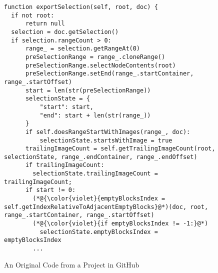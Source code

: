 \begin{figure}[t]
	\centering
	\begin{lstlisting}[]
function exportSelection(self, root, doc) {
  if not root: 
      return null
  selection = doc.getSelection()
  if selection.rangeCount > 0:
      range_ = selection.getRangeAt(0)
      preSelectionRange = range_.cloneRange()
      preSelectionRange.selectNodeContents(root)
      preSelectionRange.setEnd(range_.startContainer, range_.startOffset)
      start = len(str(preSelectionRange))
      selectionState = {
          "start": start,
          "end": start + len(str(range_))
      }
      if self.doesRangeStartWithImages(range_, doc):
          selectionState.startsWithImage = true
      trailingImageCount = self.getTrailingImageCount(root, selectionState, range_.endContainer, range_.endOffset)
      if trailingImageCount:
        selectionState.trailingImageCount = trailingImageCount;
      if start != 0:
        (*@{\color{violet}{emptyBlocksIndex = self.getIndexRelativeToAdjacentEmptyBlocks}@*)(doc, root, range_.startContainer, range_.startOffset)
        (*@{\color{violet}{if emptyBlocksIndex != -1:}@*) 
          selectionState.emptyBlocksIndex = emptyBlocksIndex
        ...
        \end{lstlisting}
\vspace{-12pt}
\caption{An Original Code from a Project in GitHub}
\label{example_org}
\end{figure}

